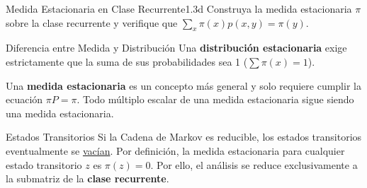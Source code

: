 \documentclass[10pt,a4paper]{article}
\begin{document}
\newpage

\vspace{5mm}

\begin{ejercicio}{Medida Estacionaria en Clase Recurrente}{1.3d}
    Construya la medida estacionaria $\pi$ sobre la clase recurrente y verifique que $\sum_x \pi(x)p(x,y) = \pi(y)$.
\end{ejercicio}

\vspace{3mm}

\begin{nota}{Diferencia entre Medida y Distribución}
    Una \textbf{distribución estacionaria} exige estrictamente que la suma de sus probabilidades sea 1 ($\sum \pi(x) = 1$). 
    
    Una \textbf{medida estacionaria} es un concepto más general y solo requiere cumplir la ecuación $\pi P = \pi$. 
    Todo múltiplo escalar de una medida estacionaria sigue siendo una medida estacionaria.
\end{nota}

\vspace{3mm}

\begin{alerta}{Estados Transitorios}
    Si la Cadena de Markov es reducible, los estados transitorios eventualmente se \ul{vacían}. Por definición, 
    la medida estacionaria para cualquier estado transitorio $z$ es $\pi(z) = 0$. Por ello, el análisis se reduce exclusivamente a la submatriz de la \textbf{clase recurrente}.
\end{alerta}

\vspace{3mm}
\end{document}
